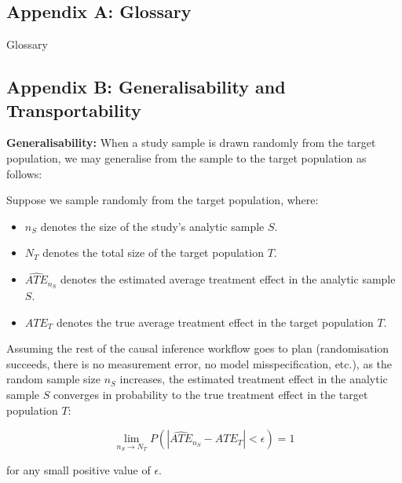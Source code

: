 \documentclass[
  single column]{article}
\providecommand{\tightlist}{%
  \setlength{\itemsep}{0pt}\setlength{\parskip}{0pt}}\usepackage{longtable,booktabs,array}
\begin{document}
\newpage{}

\subsection{Appendix A: Glossary}\label{id-app-a}

\begin{table}

\caption{\label{tbl-experiments}Glossary}

\centering{

\glossaryTerms

}

\end{table}%

\newpage{}

\subsection{Appendix B: Generalisability and
Transportability}\label{id-app-b}

\textbf{Generalisability:} When a study sample is drawn randomly from
the target population, we may generalise from the sample to the target
population as follows:

Suppose we sample randomly from the target population, where:

\begin{itemize}
\tightlist
\item
  \(n_S\) denotes the size of the study's analytic sample \(S\).
\item
  \(N_T\) denotes the total size of the target population \(T\).
\item
  \(\widehat{ATE}_{n_S}\) denotes the estimated average treatment effect
  in the analytic sample \(S\).
\item
  \(ATE_{T}\) denotes the true average treatment effect in the target
  population \(T\).
\end{itemize}

Assuming the rest of the causal inference workflow goes to plan
(randomisation succeeds, there is no measurement error, no model
misspecification, etc.), as the random sample size \(n_S\) increases,
the estimated treatment effect in the analytic sample \(S\) converges in
probability to the true treatment effect in the target population \(T\):

\[
\lim_{n_S \to N_T} P(|\widehat{ATE}_{n_S} - ATE_{T}| < \epsilon) = 1
\]

for any small positive value of \(\epsilon\).
\end{document}
